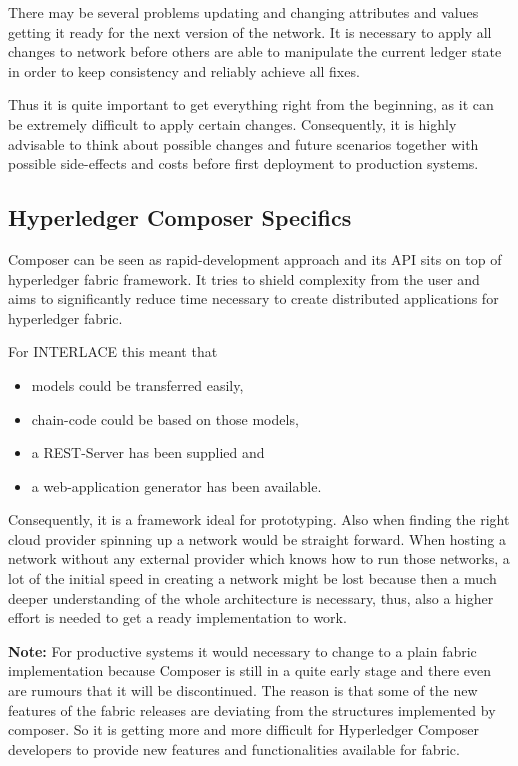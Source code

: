 There may be several problems updating and changing attributes and values getting it ready for the next version of the network. It is necessary to apply all changes to network before others are able to manipulate the current ledger state in order to keep consistency and reliably achieve all fixes.

Thus it is quite important to get everything right from the beginning, as it can be extremely difficult to apply certain changes. Consequently, it is highly advisable to think about possible changes and future scenarios together with possible side-effects and costs before first deployment to production systems.

\subsection{Hyperledger Composer Specifics}

Composer can be seen as rapid-development approach and its API sits on top of hyperledger fabric framework. It tries to shield complexity from the user and aims to significantly reduce time necessary to create distributed applications for hyperledger fabric.

For INTERLACE this meant that

\begin{itemize}
	\item models could be transferred easily,
	\item chain-code could be based on those models,
	\item a REST-Server has been supplied and
	\item a web-application generator has been available.
\end{itemize}

Consequently, it is a framework ideal for prototyping. Also when finding the right cloud provider spinning up a network would be straight forward. When hosting a network without any external provider which knows how to run those networks, a lot of the initial speed in creating a network might be lost because then a much deeper understanding of the whole architecture is necessary, thus, also a higher effort is needed to get a ready implementation to work.

\textbf{Note:} For productive systems it would necessary to change to a plain fabric implementation because Composer is still in a quite early stage and there even are rumours that it will be discontinued. The reason is that some of the new features of the fabric releases are deviating from the structures implemented by composer. So it is getting more and more difficult for Hyperledger Composer developers to provide new features and functionalities available for fabric.


